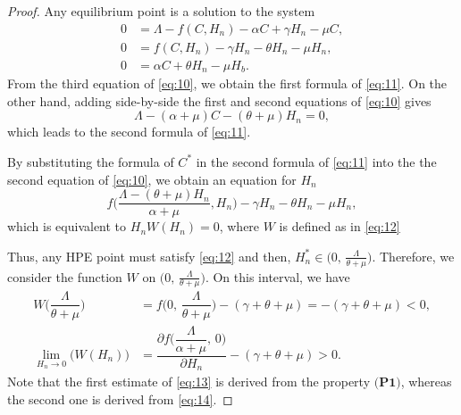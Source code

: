 \documentclass[11pt]{article}
\theoremstyle{definition}
\theoremstyle{remark}
\numberwithin{equation}{section}
\begin{document}
\begin{proof}
Any equilibrium point is a solution to the system
\begin{equation}\label{eq:10}
\begin{split}
0 &= \Lambda - f(C, H_n) -\alpha C + \gamma H_n -\mu C, \\
0 &= f(C, H_n) - \gamma H_n - \theta H_n - \mu H_n,\\
0 &= \alpha C + \theta H_n - \mu H_b.
\end{split}
\end{equation}
From the third equation of \eqref{eq:10}, we obtain the first formula of \eqref{eq:11}. 
On the other hand, adding side-by-side the first and second equations of \eqref{eq:10} gives
\begin{equation*}
    \Lambda - (\alpha + \mu)C - (\theta + \mu)H_n = 0,
\end{equation*}
which leads to the second formula of \eqref{eq:11}.

By substituting the formula of $C^*$ in the second formula of \eqref{eq:11} into the the second equation of \eqref{eq:10}, we obtain an equation for $H_n$
\begin{equation*}
    f\bigg(\dfrac{\Lambda - (\theta + \mu)H_n}{\alpha + \mu}, H_n\bigg) - \gamma H_n - \theta H_n - \mu H_n,
\end{equation*}
which is equivalent to $H_nW(H_n) = 0$, where $W$ is defined as in \eqref{eq:12}

Thus, any HPE point must satisfy \eqref{eq:12} and then, $H_n^* \in \bigl(0,\,\frac{\Lambda}{\theta + \mu}\bigr)$. 
Therefore, we consider the function $W$ on $\big(0,\,\frac{\Lambda}{\theta + \mu}\big)$.
On this interval, we have
\begin{equation}\label{eq:13}
\begin{split}
W\bigg(\dfrac{\Lambda}{\theta + \mu}\bigg) &= f\bigg(0,\, \dfrac{\Lambda}{\theta + \mu}\bigg) - (\gamma + \theta + \mu) = -(\gamma + \theta + \mu) < 0,\\
\lim_{H_n \to 0}\bigl(W(H_n)\bigr) &= \dfrac{\partial f\bigg(\dfrac{\Lambda}{\alpha + \mu},\,0\bigg)}{\partial H_n} - (\gamma + \theta + \mu) > 0.
\end{split}
\end{equation}
Note that the first estimate of \eqref{eq:13} is derived from the property $\textbf{(P1)}$, whereas the second one is derived from \eqref{eq:14}.


\end{proof}
\end{document}
